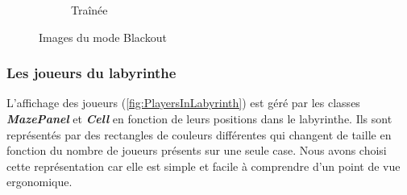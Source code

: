 \begin{figure}[!htb]
\begin{subfigure}{4.3cm}
        \caption{Traînée}
        \label{fig:HiddenLabyrinthWithParticles}
    \end{subfigure}
    \caption{Images du mode Blackout}%
    \label{fig:BlackoutModeLabyrinth}
\end{figure}
\FloatBarrier

\subsubsection*{Les joueurs du labyrinthe}

L'affichage des joueurs (\ref{fig:PlayersInLabyrinth}) est géré par les classes \textbf{\textit{MazePanel}} et \textbf{\textit{Cell}} en fonction de leurs positions dans le labyrinthe. Ils sont représentés par des rectangles de couleurs différentes qui changent de taille en fonction du nombre de joueurs présents sur une seule case. Nous avons choisi cette représentation car elle est simple et facile à comprendre d'un point de vue ergonomique.

